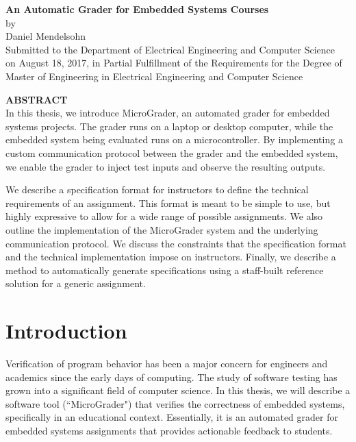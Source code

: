 \documentclass[12pt]{article}
\newcommand{\mytitle}{\textbf{An Automatic Grader for Embedded Systems Courses}}
\newcommand{\mydate}{August 18, 2017}
\begin{document}
\addtocounter{page}{1}

\newpage
\mbox{}
\newpage

\begin{center}
\mytitle \\
by \\
Daniel Mendelsohn \\
\vspace{12pt}
Submitted to the Department of Electrical Engineering and Computer Science\\
 on \mydate{}, in Partial Fulfillment of the Requirements for the Degree of\\
 Master of Engineering in Electrical Engineering and Computer Science
\end{center}
\vspace{12pt}
\textbf{ABSTRACT} \\

\noindent In this thesis, we introduce MicroGrader, an automated grader for embedded systems projects.  The grader runs on a laptop or desktop computer, while the embedded system being evaluated runs on a microcontroller.  By implementing a custom communication protocol between the grader and the embedded system, we enable the grader to inject test inputs and observe the resulting outputs.

We describe a specification format for instructors to define the technical requirements of an assignment.  This format is meant to be simple to use, but highly expressive to allow for a wide range of possible assignments.  We also outline the implementation of the MicroGrader system and the underlying communication protocol.  We discuss the constraints that the specification format and the technical implementation impose on instructors.  Finally, we describe a method to automatically generate specifications using a staff-built reference solution for a generic assignment. 

\newpage
\mbox{}
\newpage

\tableofcontents

\doublespacing

\newpage
\section{Introduction}
Verification of program behavior has been a major concern for engineers and academics since the early days of computing.  The study of software testing has grown into a significant field of computer science.  In this thesis, we will describe a software tool (``MicroGrader") that verifies the correctness of embedded systems, specifically in an educational context.  Essentially, it is an automated grader for embedded systems assignments that provides actionable feedback to students.
\end{document}
